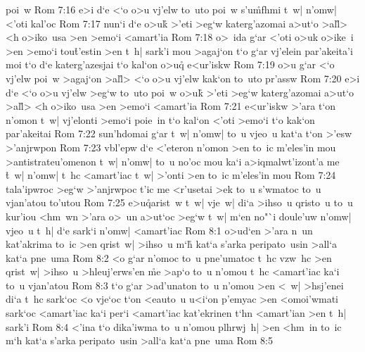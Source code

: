 poi~w\bibvsend
\vs Rom 7:16
e>i
d`e
<`o
o>u
vj'elw
to~uto
poi~w
s'u\r{m}fhmi
t~w|
n'omw|
<'oti
kal'oc\bibvsend
\vs Rom 7:17
nun`i
d`e
o>uk\r{}
>'eti
>eg`w
katerg'azomai
a>ut`o
>al\r{l}>
<h
o>iko~usa
>en
>emo`i
<amart'ia\bibvsend
\vs Rom 7:18
o>~ida
g`ar
<'oti
o>uk
o>ike~i
>en
>emo`i
tou\r{t}'estin
>en
t~h|
sark'i
mou
>agaj`on
t`o
g`ar
vj'elein
par'akeita'i
moi
t`o
d`e
katerg'azesjai
t`o
kal`on
o>uq\r{}
e<ur'iskw\bibvsend
\vs Rom 7:19
o>u
g`ar
<`o
vj'elw
poi~w
>agaj`on
>al\r{l}>
<`o
o>u
vj'elw
kak`on
to~uto
pr'assw\bibvsend
\vs Rom 7:20
e>i
d`e
<`o
o>u
vj'elw
>eg`w
to~uto
poi~w
o>uk\r{}
>'eti
>eg`w
katerg'azomai
a>ut`o
>al\r{l}>
<h
o>iko~usa
>en
>emo`i
<amart'ia\bibvsend
\vs Rom 7:21
e<ur'iskw
>'ara
t`on
n'omon
t~w|
vj'elonti
>emo`i
poie~in
t`o
kal`on
<'oti
>emo`i
t`o
kak`on
par'akeitai\bibvsend
\vs Rom 7:22
sun'hdomai
g`ar
t~w|
n'omw|
to~u
vjeo~u
kat`a
t`on
>'esw
>'anjrwpon\bibvsend
\vs Rom 7:23
vbl'epw
d`e
<'eteron
n'omon
>en
to~ic
m'eles'in
mou
>antistrateu'omenon
t~w|
n'omw|
to~u
no'oc
mou
ka`i
a>iqmalwt'izont'a
me
\r{t}~w|
n'omw|
t~hc
<amart'iac
t~w|
>'onti
>en
to~ic
m'eles'in
mou\bibvsend
\vs Rom 7:24
tala'ipwroc
>eg`w
>'anjrwpoc
t'ic
me
<r'usetai
>ek
to~u
s'wmatoc
to~u
vjan'atou
to'utou\bibvsend
\vs Rom 7:25
e>u\r{q}arist~w
t~w|
vje~w|
di`a
>ihso~u
qristo~u
to~u
kur'iou
<hm~wn
>'ara
o>~un
a>ut`oc
>eg`w
t~w|
m`en
no"`i
doule'uw
n'omw|
vjeo~u
t~h|
d`e
sark`i
n'omw|
<amart'iac\bibvsend
\vs Rom 8:1
o>ud`en
>'ara
n~un
kat'akrima
to~ic
>en
qrist~w|
>ihso~u
m`h\r{}
kat`a
s'arka
peripato~usin
>all`a
kat`a
pne~uma\bibvsend
\vs Rom 8:2
<o
g`ar
n'omoc
to~u
pne'umatoc
t~hc
vzw~hc
>en
qrist~w|
>ihso~u
>hleuj'erws'en
\r{m}e
>ap`o
to~u
n'omou
t~hc
<amart'iac
ka`i
to~u
vjan'atou\bibvsend
\vs Rom 8:3
t`o
g`ar
>ad'unaton
to~u
n'omou
>en
<~w|
>hsj'enei
di`a
t~hc
sark`oc
<o
vje`oc
t`on
<eauto~u
u<i`on
p'emyac
>en
<omoi'wmati
sark`oc
<amart'iac
ka`i
per`i
<amart'iac
kat'ekrinen
t`hn
<amart'ian
>en
t~h|
sark'i\bibvsend
\vs Rom 8:4
<'ina
t`o
dika'iwma
to~u
n'omou
plhrwj~h|
>en
<hm~in
to~ic
m`h
kat`a
s'arka
peripato~usin
>all`a
kat`a
pne~uma\bibvsend
\vs Rom 8:5
